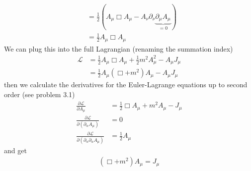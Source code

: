 \documentclass[10pt,a4paper]{book}
\theoremstyle{definition}
\begin{document}
\begin{enumerate}[label=(\alph*)]
\begin{align}
    &=\frac{1}{2}\left(A_\mu \Box A_\mu- A_\nu \partial_\nu \underbrace{\partial_\mu A_\mu}_{=0}\right)\\ 
    &=\frac{1}{2}A_\mu \Box A_\mu
\end{align}
We can plug this into the full Lagrangian (renaming the summation index)
\begin{align}
    \mathscr{L}&=\frac{1}{2}A_\mu \Box A_\mu+\frac{1}{2}m^2A_\mu^2-A_\mu J_\mu\\
    &=\frac{1}{2}A_\mu\left(\Box+m^2 \right)A_\mu-A_\mu J_\mu
\end{align} 
then we calculate the derivatives for the Euler-Lagrange equations up to second order (see problem 3.1)
\begin{align}
\frac{\partial\mathcal{L}}{\partial A_\mu}&=\frac{1}{2}\Box A_\mu+m^2A_\mu-J_\mu\\
\frac{\partial\mathcal{L}}{\partial (\partial_\alpha A_\mu)}&=0\\
\frac{\partial\mathcal{L}}{\partial (\partial_\alpha\partial_\alpha A_\mu)}&=\frac{1}{2}A_\mu
\end{align}
and get
\begin{align}
(\Box+m^2)A_\mu=J_\mu
\end{align}
   
\end{enumerate}
\end{document}
